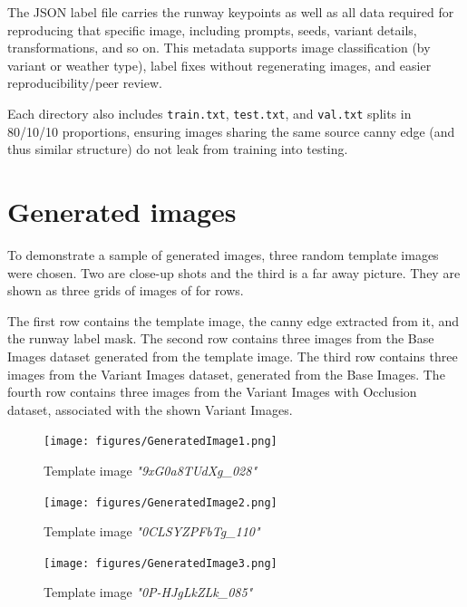 The JSON label file carries the runway keypoints as well as all data required for reproducing that specific image, including prompts, seeds, variant details, transformations, and so on. 
This metadata supports image classification (by variant or weather type), label fixes without regenerating images, and easier reproducibility/peer review.

Each directory also includes \texttt{train.txt}, \texttt{test.txt}, and \texttt{val.txt} splits in 80/10/10 proportions, ensuring images sharing the same source canny edge (and thus similar structure) do not leak from training into testing.

\section{Generated images}


To demonstrate a sample of generated images, three random template images were
chosen. Two are close-up shots and the third is a far away picture. They
are shown as three grids of images of for rows.

The first row contains the template image, the canny edge extracted from it,
and the runway label mask. The second row contains three images from the Base
Images dataset generated from the template image. The third row contains three
images from the Variant Images dataset, generated from the Base Images. The
fourth row contains three images from the Variant Images with Occlusion dataset,
associated with the shown Variant Images.

\begin{figure}[htbp]
\centering
\texttt{[image: figures/GeneratedImage1.png]}
  \caption{Template image \emph{"9xG0a8TUdXg\_028"} }
\label{fig:noise_to_image}
\end{figure}

\begin{figure}[htbp]
\centering
\texttt{[image: figures/GeneratedImage2.png]}
  \caption{Template image \emph{"0CLSYZPFbTg\_110"} }
\label{fig:noise_to_image}
\end{figure}

\begin{figure}[htbp]
\centering
\texttt{[image: figures/GeneratedImage3.png]}
  \caption{Template image \emph{"0P-HJgLkZLk\_085"} }
\label{fig:noise_to_image}
\end{figure}
